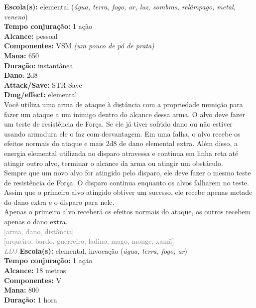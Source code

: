 \documentclass{RPG_Adventure}[2021/10/20]
\begin{document}
{\small \t \textbf{Escola(s):} elemental (\textit{água, terra, fogo, ar, luz, sombras, relâmpago, metal, veneno})\\\t \textbf{Tempo conjuração:} 1 ação\\\t \textbf{Alcance:} pessoal\\\t \textbf{Componentes:} VSM \textit{(um pouco de pó de prata)}\\\t \textbf{Mana:} 650\\\t \textbf{Duração:} instantânea\\\t \textbf{Dano}: 2d8\\\t \textbf{Attack/Save:} STR Save\\\t \textbf{Dmg/effect:} elemental\\}
{\normalsize Você utiliza uma arma de ataque à distância com a propriedade munição para fazer um ataque a um inimigo dentro do alcance dessa arma. O alvo deve fazer um teste de resistência de Força. Se ele já tiver sofrido dano ou não estiver usando armadura ele o faz com desvantagem. Em uma falha, o alvo recebe os efeitos normais do ataque e mais 2d8 de dano elemental extra. Além disso, a energia elemental utilizada no disparo atravessa e continua em linha reta até atingir outro alvo, terminar o alcance da arma ou atingir um obstáculo.\\Sempre que um novo alvo for atingido pelo disparo, ele deve fazer o mesmo teste de resistência de Força. O disparo continua enquanto os alvos falharem no teste. Assim que o primeiro alvo atingido obtiver um sucesso, ele recebe apenas metade do dano extra e o disparo para nele.\\Apenas o primeiro alvo receberá os efeitos normais do ataque, os outros recebem apenas o dano extra.\\}
{\scriptsize \textcolor{gray}{[arma, dano, distância]\\}}
{\scriptsize \textcolor{gray}{[arqueiro, bardo, guerreiro, ladino, mago, monge, xamã]\\}}
{\tiny \textcolor{gray}{\textit{LDJ}}}\jump{}
{\small \t \textbf{Escola(s):} elemental, invocação (\textit{água, terra, fogo, ar})\\\t \textbf{Tempo conjuração:} 1 ação\\\t \textbf{Alcance:} 18 metros\\\t \textbf{Componentes:} V\\\t \textbf{Mana:} 800\\\t \textbf{Duração:} 1 hora\\}
\end{document}
